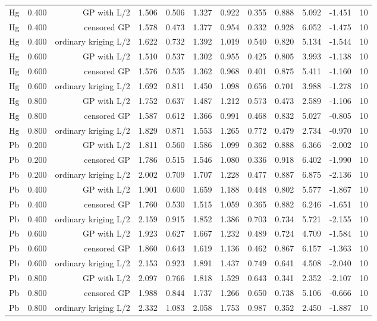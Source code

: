 \begin{table}[htbp]
\begin{tabular}{llrrrrrrrrrr}
Hg & 0.400 & GP with L/2 & 1.506 & 0.506 & 1.327 & 0.922 & 0.355 & 0.888 & 5.092 & -1.451 & 10 \\
Hg & 0.400 & censored GP & 1.578 & 0.473 & 1.377 & 0.954 & 0.332 & 0.928 & 6.052 & -1.475 & 10 \\
Hg & 0.400 & ordinary kriging L/2 & 1.622 & 0.732 & 1.392 & 1.019 & 0.540 & 0.820 & 5.134 & -1.544 & 10 \\
Hg & 0.600 & GP with L/2 & 1.510 & 0.537 & 1.302 & 0.955 & 0.425 & 0.805 & 3.993 & -1.138 & 10 \\
Hg & 0.600 & censored GP & 1.576 & 0.535 & 1.362 & 0.968 & 0.401 & 0.875 & 5.411 & -1.160 & 10 \\
Hg & 0.600 & ordinary kriging L/2 & 1.692 & 0.811 & 1.450 & 1.098 & 0.656 & 0.701 & 3.988 & -1.278 & 10 \\
Hg & 0.800 & GP with L/2 & 1.752 & 0.637 & 1.487 & 1.212 & 0.573 & 0.473 & 2.589 & -1.106 & 10 \\
Hg & 0.800 & censored GP & 1.587 & 0.612 & 1.366 & 0.991 & 0.468 & 0.832 & 5.027 & -0.805 & 10 \\
Hg & 0.800 & ordinary kriging L/2 & 1.829 & 0.871 & 1.553 & 1.265 & 0.772 & 0.479 & 2.734 & -0.970 & 10 \\
Pb & 0.200 & GP with L/2 & 1.811 & 0.560 & 1.586 & 1.099 & 0.362 & 0.888 & 6.366 & -2.002 & 10 \\
Pb & 0.200 & censored GP & 1.786 & 0.515 & 1.546 & 1.080 & 0.336 & 0.918 & 6.402 & -1.990 & 10 \\
Pb & 0.200 & ordinary kriging L/2 & 2.002 & 0.709 & 1.707 & 1.228 & 0.477 & 0.887 & 6.875 & -2.136 & 10 \\
Pb & 0.400 & GP with L/2 & 1.901 & 0.600 & 1.659 & 1.188 & 0.448 & 0.802 & 5.577 & -1.867 & 10 \\
Pb & 0.400 & censored GP & 1.760 & 0.530 & 1.515 & 1.059 & 0.365 & 0.882 & 6.246 & -1.651 & 10 \\
Pb & 0.400 & ordinary kriging L/2 & 2.159 & 0.915 & 1.852 & 1.386 & 0.703 & 0.734 & 5.721 & -2.155 & 10 \\
Pb & 0.600 & GP with L/2 & 1.923 & 0.627 & 1.667 & 1.232 & 0.489 & 0.724 & 4.709 & -1.584 & 10 \\
Pb & 0.600 & censored GP & 1.860 & 0.643 & 1.619 & 1.136 & 0.462 & 0.867 & 6.157 & -1.363 & 10 \\
Pb & 0.600 & ordinary kriging L/2 & 2.153 & 0.923 & 1.891 & 1.437 & 0.749 & 0.641 & 4.508 & -2.040 & 10 \\
Pb & 0.800 & GP with L/2 & 2.097 & 0.766 & 1.818 & 1.529 & 0.643 & 0.341 & 2.352 & -2.107 & 10 \\
Pb & 0.800 & censored GP & 1.988 & 0.844 & 1.737 & 1.266 & 0.650 & 0.738 & 5.106 & -0.666 & 10 \\
Pb & 0.800 & ordinary kriging L/2 & 2.332 & 1.083 & 2.058 & 1.753 & 0.987 & 0.352 & 2.450 & -1.887 & 10 \\
\bottomrule
\end{tabular}
\end{table}
